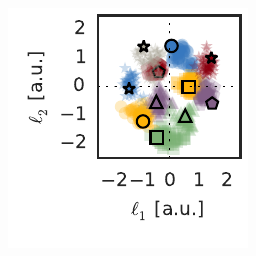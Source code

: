 \begin{figure}[t!]
\begin{subfigure}[b]{1.6in}
    \label{fig:rgc_dist}
  \end{subfigure}
  ~
  \begin{subfigure}[b]{1.6in}
    \centering
    \caption{}
    \vspace{-.2in}
    \includegraphics[width=\textwidth]{figures/ch3/rgc_on_locations.pdf}
    \label{fig:rgc_locs}
  \end{subfigure}
  \\
  \vspace{-.2in}
  \begin{subfigure}[b]{1.85in}
    \centering
    \caption{}
    \vspace{-.2in}

\end{subfigure}
\end{figure}
